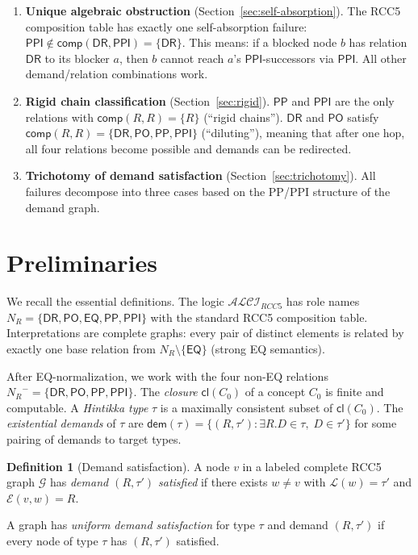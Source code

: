 \documentclass[a4paper,11pt]{article}
\theoremstyle{definition}
\newtheorem{definition}[theorem]{Definition}
\newcommand{\ALCIRCC}[1]{\ensuremath{\mathcal{ALCI}_{\mathit{RCC#1}}}}
\newcommand{\NR}{\ensuremath{N_R}}
\newcommand{\DR}{\ensuremath{\mathsf{DR}}}
\newcommand{\PO}{\ensuremath{\mathsf{PO}}}
\newcommand{\EQ}{\ensuremath{\mathsf{EQ}}}
\newcommand{\PP}{\ensuremath{\mathsf{PP}}}
\newcommand{\PPI}{\ensuremath{\mathsf{PPI}}}
\newcommand{\comp}{\ensuremath{\mathsf{comp}}}
\newcommand{\cl}{\ensuremath{\mathsf{cl}}}
\begin{document}
\begin{enumerate}[nosep]
  \item \textbf{Unique algebraic obstruction} (Section~\ref{sec:self-absorption}).
    The RCC5 composition table has exactly one self-absorption failure:
    $\PPI \notin \comp(\DR, \PPI) = \{\DR\}$.  This means: if a
    blocked node $b$ has relation $\DR$ to its blocker $a$, then
    $b$ cannot reach $a$'s $\PPI$-successors via $\PPI$.  All other
    demand/relation combinations work.

  \item \textbf{Rigid chain classification} (Section~\ref{sec:rigid}).
    $\PP$ and $\PPI$ are the only relations with
    $\comp(R,R) = \{R\}$ (``rigid chains'').  $\DR$ and $\PO$
    satisfy $\comp(R,R) = \{\DR,\PO,\PP,\PPI\}$ (``diluting''),
    meaning that after one hop, all four relations become possible
    and demands can be redirected.

  \item \textbf{Trichotomy of demand satisfaction}
    (Section~\ref{sec:trichotomy}).  All failures decompose into
    three cases based on the PP/PPI structure of the demand graph.
\end{enumerate}


\section{Preliminaries}
\label{sec:prelim}

We recall the essential definitions.  The logic $\ALCIRCC{5}$ has
role names $\NR = \{\DR, \PO, \EQ, \PP, \PPI\}$ with the standard
RCC5 composition table.  Interpretations are complete graphs:
every pair of distinct elements is related by exactly one base
relation from $\NR \setminus \{\EQ\}$ (strong EQ semantics).

After EQ-normalization, we work with the four non-EQ relations
$\NR^{-} = \{\DR, \PO, \PP, \PPI\}$.  The \emph{closure}
$\cl(C_0)$ of a concept $C_0$ is finite and computable.  A
\emph{Hintikka type} $\tau$ is a maximally consistent subset of
$\cl(C_0)$.  The \emph{existential demands} of $\tau$ are
$\mathsf{dem}(\tau) = \{(R, \tau') : \exists R.D \in \tau,\;
D \in \tau'\}$ for some pairing of demands to target types.

\begin{definition}[Demand satisfaction]
A node $v$ in a labeled complete RCC5 graph $\mathcal{G}$ has
\emph{demand $(R, \tau')$ satisfied} if there exists $w \neq v$
with $\mathcal{L}(w) = \tau'$ and $\mathcal{E}(v, w) = R$.

A graph has \emph{uniform demand satisfaction} for type $\tau$
and demand $(R, \tau')$ if every node of type $\tau$ has $(R,\tau')$
satisfied.
\end{definition}
\end{document}
